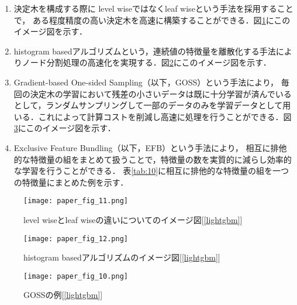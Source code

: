 \documentclass[dvipdfmx]{jreport}
\begin{document}
\begin{tcolorbox}[title=\textbf{LightGBMの特徴}]
    \begin{enumerate}
        \item 決定木を構成する際に
        level wiseではなくleaf wiseという手法を採用することで，
        ある程度精度の高い決定木を高速に構築することができる．図\ref{fig:11}にこのイメージ図を示す．
        \item
        histogram basedアルゴリズムという，連続値の特徴量を離散化する手法によりノード分割処理の高速化を実現する．図\ref{fig:12}にこのイメージ図を示す．
        \item
        Gradient-based One-sided Sampling（以下，GOSS）という手法により，
        毎回の決定木の学習において残差の小さいデータは既に十分学習が済んでいるとして，ランダムサンプリングして一部のデータのみを学習データとして用いる．これによって計算コストを削減し高速に処理を行うことができる．図\ref{fig:10}にこのイメージ図を示す．
        \item
        Exclusive Feature Bundling（以下，EFB）という手法により，
        相互に排他的な特徴量の組をまとめて扱うことで，特徴量の数を実質的に減らし効率的な学習を行うことができる．
        表\ref{tab:10}に相互に排他的な特徴量の組を一つの特徴量にまとめた例を示す．
    \end{enumerate}
\end{tcolorbox}
\begin{figure}[h]
    \begin{center}
        \texttt{[image: paper\_fig\_11.png]}
        \caption{level wiseとleaf wiseの違いについてのイメージ図[\ref{lightgbm}]} \label{fig:11}
    \end{center}
\end{figure}
\begin{figure}[h]
    \begin{center}
        \texttt{[image: paper\_fig\_12.png]}
        \caption{histogram basedアルゴリズムのイメージ図[\ref{lightgbm}]} \label{fig:12}
    \end{center}
\end{figure}
\begin{figure}[h]
    \begin{center}
        \texttt{[image: paper\_fig\_10.png]}
        \caption{GOSSの例[\ref{lightgbm}]} \label{fig:10}
    \end{center}
\end{figure}
\end{document}
